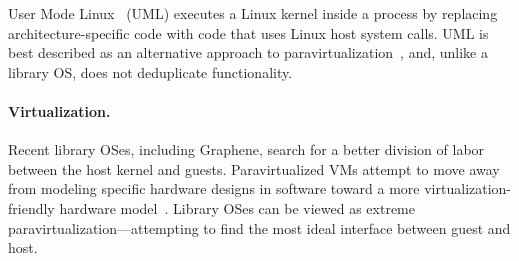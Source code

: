
\begin{comment}
Dune~\citep{belay12dune} %
leverages virtualization hardware 
to allow an application
to safely manage privileged CPU features
such as page tables and interrupts.
Dune's goals are complimentary to ours; we expect that
certain aspects of the PAL implementation would be simplified on Dune.
\end{comment}

User Mode Linux~\citep{user-mode-linux} (UML) executes a Linux kernel inside a process
by replacing  architecture-specific code with 
code 
that uses Linux host system calls. %
UML is best described as  an alternative approach to paravirtualization~\citep{barham03xen},
and, unlike a library OS, does not deduplicate functionality.


\paragraph{Virtualization.}
Recent library OSes, including Graphene,
search for a better
division of labor between the host kernel and guests.
Paravirtualized VMs attempt to move away from modeling specific hardware designs in software
toward a more virtualization-friendly hardware model~\citep{barham03xen,whitaker02denali, eiraku09outsourcing}.
Library OSes can be viewed as extreme paravirtualization---attempting
to find the most ideal interface between guest and host. %



